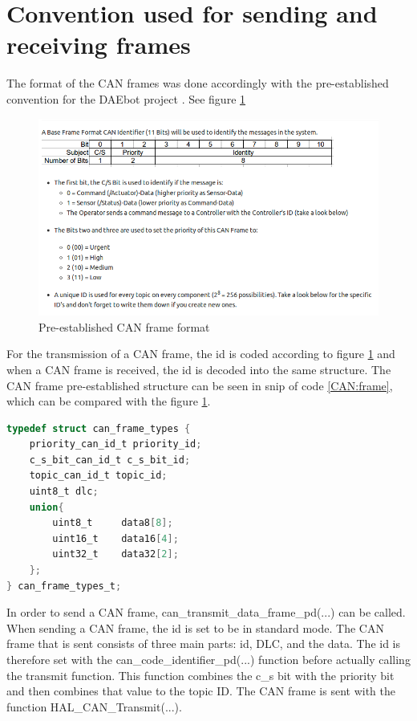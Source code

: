 \documentclass[12pt]{report}%
\begin{document}
\section{Convention used for sending and receiving frames}
\label{sec:canconv}

The format of the CAN frames was done accordingly with the pre-established convention for the DAEbot project \cite{DAEbot_Wiki}. See figure \ref{fig:can}

\begin{figure}[ht]
	\centering
	\includegraphics[width=\textwidth]{can_structure}
    \caption{Pre-established CAN frame format}
    \label{fig:can}
\end{figure}

For the transmission of a CAN frame, the id is coded according to figure \ref{fig:can} and when a CAN frame is received, the id is decoded into the same structure. The CAN frame pre-established structure can be seen in snip of code \ref{CAN:frame}, which can be compared with the figure \ref{fig:can}.

\begin{minipage}{\linewidth}
\begin{lstlisting}[caption = CAN frame, label = CAN:frame, language = C, captionpos = b]
typedef struct can_frame_types {
    priority_can_id_t priority_id;
    c_s_bit_can_id_t c_s_bit_id;
    topic_can_id_t topic_id;
    uint8_t dlc;
    union{
        uint8_t     data8[8];
        uint16_t    data16[4];
        uint32_t    data32[2];
    };
} can_frame_types_t;
\end{lstlisting}
\end{minipage}

In order to send a CAN frame, can\_transmit\_data\_frame\_pd(...) can be called. When sending a CAN frame, the id is set to be in standard mode. The CAN frame that is sent consists of three main parts: id, DLC, and the data. The id is therefore set with the can\_code\_identifier\_pd(...) function before actually calling the transmit function. This function combines the c\_s bit with the priority bit and then combines that value to the topic ID. The CAN frame is sent with the function HAL\_CAN\_Transmit(...).
\end{document}
